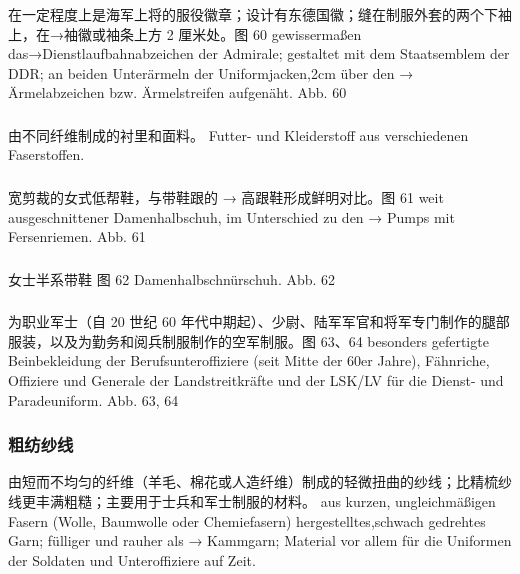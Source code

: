 \subsubsection*{}%

在一定程度上是海军上将的服役徽章；设计有东德国徽；缝在制服外套的两个下袖上，在→袖徽或袖条上方 2 厘米处。图 60
gewissermaßen das→Dienstlaufbahnabzeichen der Admirale; gestaltet mit dem Staatsemblem der DDR; an beiden Unterärmeln der Uniformjacken,2cm über den → Ärmelabzeichen bzw. Ärmelstreifen aufgenäht. Abb. 60

\subsubsection*{}%

由不同纤维制成的衬里和面料。
Futter- und Kleiderstoff aus verschiedenen Faserstoffen.

\subsubsection*{}%

宽剪裁的女式低帮鞋，与带鞋跟的 → 高跟鞋形成鲜明对比。图 61
weit ausgeschnittener Damenhalbschuh, im Unterschied zu den → Pumps mit Fersenriemen. Abb. 61

\subsubsection*{}%

女士半系带鞋 图 62
Damenhalbschnürschuh. Abb. 62

\subsubsection*{}%

为职业军士（自 20 世纪 60 年代中期起）、少尉、陆军军官和将军专门制作的腿部服装，以及为勤务和阅兵制服制作的空军制服。图 63、64
besonders gefertigte Beinbekleidung der Berufsunteroffiziere (seit Mitte der 60er Jahre), Fähnriche, Offiziere und Generale der Landstreitkräfte und der LSK/LV für die Dienst- und Paradeuniform. Abb. 63, 64

\subsubsection*{粗纺纱线}%

由短而不均匀的纤维（羊毛、棉花或人造纤维）制成的轻微扭曲的纱线；比精梳纱线更丰满粗糙；主要用于士兵和军士制服的材料。
aus kurzen, ungleichmäßigen Fasern (Wolle, Baumwolle oder Chemiefasern) hergestelltes,schwach gedrehtes Garn; fülliger und rauher als → Kammgarn; Material vor allem für die Uniformen der Soldaten und Unteroffiziere auf Zeit.

